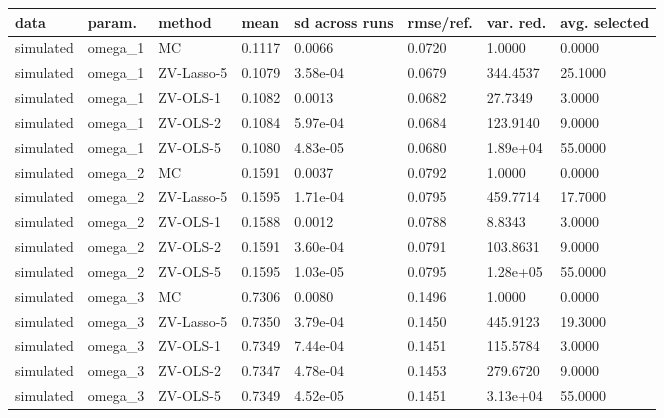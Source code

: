 \begin{tabular}{llllllll}
\toprule
data & param. & method & mean & sd across runs & rmse/ref. & var. red. & avg. selected \\
\midrule
simulated & omega\_1 & MC & 0.1117 & 0.0066 & 0.0720 & 1.0000 & 0.0000 \\
simulated & omega\_1 & ZV-Lasso-5 & 0.1079 & 3.58e-04 & 0.0679 & 344.4537 & 25.1000 \\
simulated & omega\_1 & ZV-OLS-1 & 0.1082 & 0.0013 & 0.0682 & 27.7349 & 3.0000 \\
simulated & omega\_1 & ZV-OLS-2 & 0.1084 & 5.97e-04 & 0.0684 & 123.9140 & 9.0000 \\
simulated & omega\_1 & ZV-OLS-5 & 0.1080 & 4.83e-05 & 0.0680 & 1.89e+04 & 55.0000 \\
simulated & omega\_2 & MC & 0.1591 & 0.0037 & 0.0792 & 1.0000 & 0.0000 \\
simulated & omega\_2 & ZV-Lasso-5 & 0.1595 & 1.71e-04 & 0.0795 & 459.7714 & 17.7000 \\
simulated & omega\_2 & ZV-OLS-1 & 0.1588 & 0.0012 & 0.0788 & 8.8343 & 3.0000 \\
simulated & omega\_2 & ZV-OLS-2 & 0.1591 & 3.60e-04 & 0.0791 & 103.8631 & 9.0000 \\
simulated & omega\_2 & ZV-OLS-5 & 0.1595 & 1.03e-05 & 0.0795 & 1.28e+05 & 55.0000 \\
simulated & omega\_3 & MC & 0.7306 & 0.0080 & 0.1496 & 1.0000 & 0.0000 \\
simulated & omega\_3 & ZV-Lasso-5 & 0.7350 & 3.79e-04 & 0.1450 & 445.9123 & 19.3000 \\
simulated & omega\_3 & ZV-OLS-1 & 0.7349 & 7.44e-04 & 0.1451 & 115.5784 & 3.0000 \\
simulated & omega\_3 & ZV-OLS-2 & 0.7347 & 4.78e-04 & 0.1453 & 279.6720 & 9.0000 \\
simulated & omega\_3 & ZV-OLS-5 & 0.7349 & 4.52e-05 & 0.1451 & 3.13e+04 & 55.0000 \\
\bottomrule
\end{tabular}
